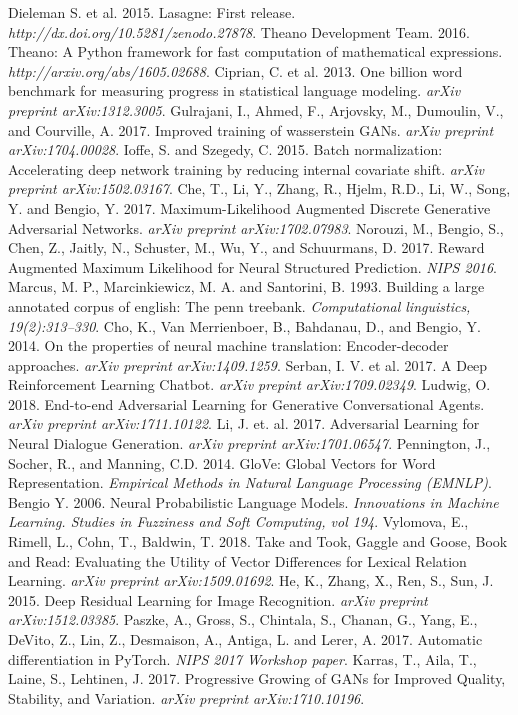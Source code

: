 \documentclass[a4paper,conference]{IEEEtran}
\begin{document}
\begin{thebibliography}{99}
 Dieleman S. et al. 2015. Lasagne: First release. \textit{http://dx.doi.org/10.5281/zenodo.27878}.
 Theano Development Team. 2016. Theano: A Python framework for fast computation of mathematical expressions. \textit{http://arxiv.org/abs/1605.02688}.
 Ciprian, C. et al. 2013. One billion word benchmark for measuring progress in statistical language modeling. \textit{arXiv preprint arXiv:1312.3005}.
 Gulrajani, I., Ahmed, F., Arjovsky, M., Dumoulin, V., and Courville, A. 2017. Improved training of wasserstein GANs. \textit{arXiv preprint arXiv:1704.00028}.
 Ioffe, S. and Szegedy, C. 2015. Batch normalization: Accelerating deep network training by reducing internal covariate shift. \textit{arXiv preprint arXiv:1502.03167}.
 Che, T., Li, Y., Zhang, R., Hjelm, R.D., Li, W., Song, Y. and Bengio, Y. 2017. Maximum-Likelihood Augmented Discrete Generative Adversarial Networks. \textit{arXiv preprint arXiv:1702.07983}.
 Norouzi, M., Bengio, S., Chen, Z., Jaitly, N., Schuster, M., Wu, Y., and Schuurmans, D. 2017. Reward Augmented Maximum Likelihood for Neural Structured Prediction. \textit{NIPS 2016}.
 Marcus, M. P., Marcinkiewicz, M. A. and Santorini, B. 1993. Building a large annotated corpus of english: The penn treebank. \textit{Computational linguistics, 19(2):313–330}.
 Cho, K., Van Merrienboer, B., Bahdanau, D., and Bengio, Y. 2014. On the properties of neural machine translation: Encoder-decoder approaches.
\textit{arXiv preprint arXiv:1409.1259}.
 Serban, I. V. et al. 2017. A Deep Reinforcement Learning Chatbot. \textit{arXiv prepint arXiv:1709.02349}.
 Ludwig, O. 2018. End-to-end Adversarial Learning for Generative Conversational Agents. \textit{arXiv preprint arXiv:1711.10122}.
 Li, J. et. al. 2017. Adversarial Learning for Neural Dialogue Generation. \textit{arXiv preprint arXiv:1701.06547}.
 Pennington, J., Socher, R., and Manning, C.D. 2014. GloVe: Global Vectors for Word Representation. \textit{Empirical Methods in Natural Language Processing (EMNLP)}.
 Bengio Y. 2006. Neural Probabilistic Language Models. \textit{Innovations in Machine Learning. Studies in Fuzziness and Soft Computing, vol 194}.
 Vylomova, E., Rimell, L., Cohn, T., Baldwin, T. 2018. Take and Took, Gaggle and Goose, Book and Read: Evaluating the Utility of Vector Differences for Lexical Relation Learning. \textit{arXiv preprint arXiv:1509.01692}.
 He, K., Zhang, X., Ren, S., Sun, J. 2015. Deep Residual Learning for Image Recognition. \textit{arXiv preprint arXiv:1512.03385}.
 Paszke, A., Gross, S., Chintala, S., Chanan, G., Yang, E., DeVito, Z., Lin, Z., Desmaison, A., Antiga, L. and Lerer, A. 2017. Automatic differentiation in PyTorch. \textit{NIPS 2017 Workshop paper}.
 Karras, T., Aila, T., Laine, S., Lehtinen, J. 2017. Progressive Growing of GANs for Improved Quality, Stability, and Variation. \textit{arXiv preprint arXiv:1710.10196}.

\end{thebibliography}




\end{document}
